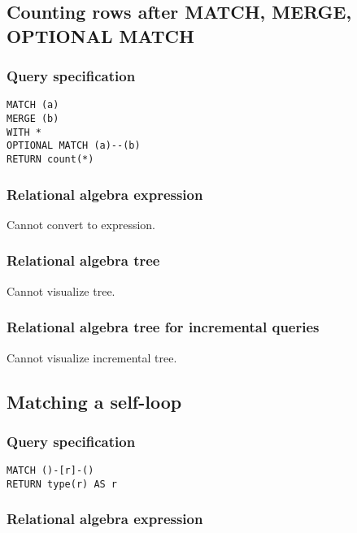 \subsection{Counting rows after MATCH, MERGE, OPTIONAL MATCH}

\subsubsection*{Query specification}

\begin{lstlisting}
MATCH (a)
MERGE (b)
WITH *
OPTIONAL MATCH (a)--(b)
RETURN count(*)
\end{lstlisting}

\subsubsection*{Relational algebra expression}

Cannot convert to expression.

\subsubsection*{Relational algebra tree}

Cannot visualize tree.

\subsubsection*{Relational algebra tree for incremental queries}

Cannot visualize incremental tree.

\subsection{Matching a self-loop}

\subsubsection*{Query specification}

\begin{lstlisting}
MATCH ()-[r]-()
RETURN type(r) AS r
\end{lstlisting}

\subsubsection*{Relational algebra expression}


